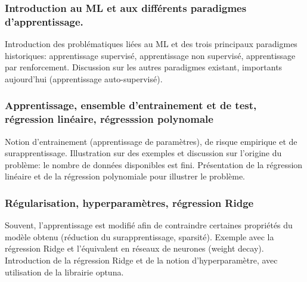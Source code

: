 \documentclass[
10pt, %
a4paper, %
oneside, %
headinclude,footinclude, %
BCOR5mm, %
]{scrartcl}
\begin{document}
\subsubsection{Introduction au ML et aux différents paradigmes d'apprentissage.}%
\label{ssub:}

Introduction des problématiques liées au ML et  des trois principaux  paradigmes historiques: apprentissage supervisé, apprentissage non supervisé, apprentissage par renforcement. Discussion sur les autres paradigmes existant, importants aujourd'hui (apprentissage auto-supervisé).

\subsubsection{Apprentissage, ensemble d'entrainement et de test, régression linéaire, régresssion polynomale}%
\label{ssub:}

Notion d'entrainement (apprentissage de paramètres), de risque empirique et de surapprentissage. Illustration sur des exemples et discussion sur l'origine du problème: le nombre de données disponibles est fini. Présentation de la régression linéaire et de la régression polynomiale pour illustrer le problème.


\subsubsection{Régularisation, hyperparamètres, régression Ridge}%
\label{ssub:regularisation}

Souvent, l'apprentissage est modifié afin de contraindre certaines propriétés du modèle obtenu (réduction du surapprentissage, sparsité). Exemple avec la régression Ridge et l'équivalent en réseaux de neurones (weight decay). Introduction de la régression Ridge et de la notion d'hyperparamètre, avec utilisation de la librairie optuna. 

%
\end{document}
